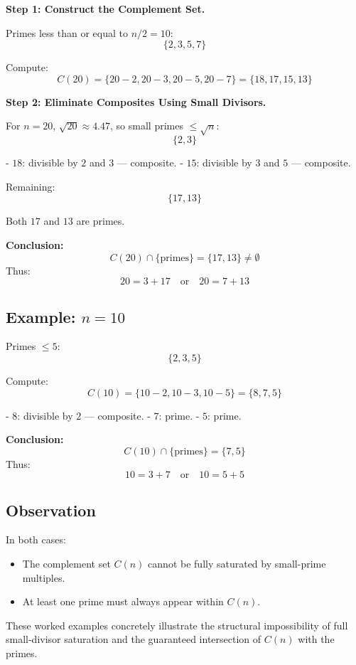 \documentclass[11pt]{article}
\begin{document}
	\textbf{Step 1: Construct the Complement Set.}
	
	Primes less than or equal to \( n/2 = 10 \):
	\[
	\{2, 3, 5, 7\}
	\]
	
	Compute:
	\[
	C(20) = \{20 - 2, 20 - 3, 20 - 5, 20 - 7\} = \{18, 17, 15, 13\}
	\]
	
	\textbf{Step 2: Eliminate Composites Using Small Divisors.}
	
	For \( n = 20 \), \(\sqrt{20} \approx 4.47\), so small primes \( \leq \sqrt{n} \):
	\[
	\{2, 3\}
	\]
	
	- \( 18 \): divisible by \( 2 \) and \( 3 \) — composite.
	- \( 15 \): divisible by \( 3 \) and \( 5 \) — composite.
	
	Remaining:
	\[
	\{17, 13\}
	\]
	
	Both \( 17 \) and \( 13 \) are primes.
	
	\textbf{Conclusion:}
	\[
	C(20) \cap \{\text{primes}\} = \{17, 13\} \neq \emptyset
	\]
	Thus:
	\[
	20 = 3 + 17 \quad \text{or} \quad 20 = 7 + 13
	\]
	
	\subsection*{Example: \( n = 10 \)}
	
	Primes \( \leq 5 \):
	\[
	\{2, 3, 5\}
	\]
	
	Compute:
	\[
	C(10) = \{10 - 2, 10 - 3, 10 - 5\} = \{8, 7, 5\}
	\]
	
	- \( 8 \): divisible by \( 2 \) — composite.
	- \( 7 \): prime.
	- \( 5 \): prime.
	
	\textbf{Conclusion:}
	\[
	C(10) \cap \{\text{primes}\} = \{7, 5\}
	\]
	Thus:
	\[
	10 = 3 + 7 \quad \text{or} \quad 10 = 5 + 5
	\]
	
	\subsection*{Observation}
	
	In both cases:
	\begin{itemize}
		\item The complement set \( C(n) \) cannot be fully saturated by small-prime multiples.
		\item At least one prime must always appear within \( C(n) \).
	\end{itemize}
	
	These worked examples concretely illustrate the structural impossibility of full small-divisor saturation and the guaranteed intersection of \( C(n) \) with the primes.
\end{document}
